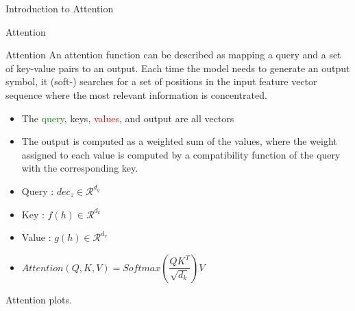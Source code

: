 \documentclass[10pt]{beamer}
\begin{document}
\begin{frame}[fragile]{Introduction to Attention}
\begin{center}
	\end{center}
\end{frame}

%


\begin{frame}[fragile]{Attention}
\begin{block}{Attention}
	An attention function can be described as mapping a query and a set of key-value pairs to an output.
	Each time the model needs to generate an output symbol, it (soft-) searches for a set of positions in the input feature vector sequence where the most relevant information is concentrated.
\end{block}

\begin{itemize}
	\item The \textcolor{green}{query}, \textcolor{red!60}{keys}, \textcolor{red}{values}, and output are all vectors
	\item The output is computed as a weighted sum of the values, where the weight assigned to each value is computed by a compatibility function of the query with the corresponding key.
	\item Query : $dec_z \in \mathcal{R}^{d_q}$
	\item Key : $f(h) \in \mathcal{R}^{d_k}$
	\item Value : $g(h) \in \mathcal{R}^{d_v}$
	\item $Attention(Q,K,V) = Softmax(\dfrac{QK^T}{\sqrt{d_k}}) V$
\end{itemize}
Attention plots.
\end{frame}
\end{document}
